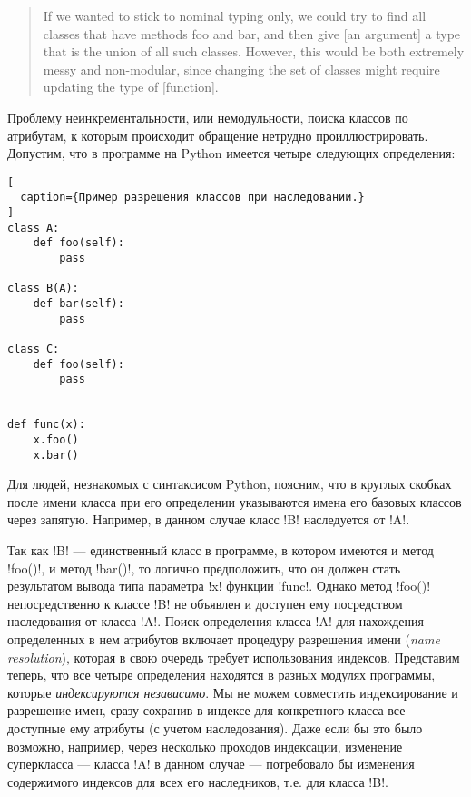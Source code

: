 \begin{quote}
  If we wanted to stick to nominal typing only, we could try to find all classes
  that have methods foo and bar, and then give [an argument] a type that is the
  union of all such classes. However, this would be both extremely messy and
  non-modular, since changing the set of classes might require updating the type
  of [function].
\end{quote}

Проблему неинкрементальности, или немодульности, поиска классов по атрибутам, к
которым происходит обращение нетрудно проиллюстрировать. Допустим, что в
программе на Python имеется четыре следующих определения:

\begin{lstlisting}[
  caption={Пример разрешения классов при наследовании.}
]
class A:
    def foo(self):
        pass

class B(A):
    def bar(self):
        pass

class C:
    def foo(self):
        pass


def func(x):
    x.foo()
    x.bar()

\end{lstlisting}

Для людей, незнакомых с синтаксисом Python, поясним, что в круглых скобках после
имени класса при его определении указываются имена его базовых классов
через запятую. Например, в данном случае класс !B! наследуется от !A!.

Так как !B! --- единственный класс в программе, в котором имеются и метод
!foo()!, и метод !bar()!, то логично предположить, что он должен стать
результатом вывода типа параметра !x!  функции !func!. Однако метод !foo()!
непосредственно к классе !B!  не объявлен и доступен ему посредством
наследования от класса !A!. Поиск определения класса !A! для нахождения
определенных в нем атрибутов включает процедуру разрешения имени (\emph{name
  resolution}), которая в свою очередь требует использования индексов.
Представим теперь, что все четыре определения находятся в разных модулях
программы, которые \emph{индексируются независимо}. Мы не можем совместить
индексирование и разрешение имен, сразу сохранив в индексе для конкретного
класса все доступные ему атрибуты (с учетом наследования).  Даже если бы это
было возможно, например, через несколько проходов индексации, изменение
суперкласса --- класса !A! в данном случае --- потребовало бы изменения
содержимого индексов для всех его наследников, т.е. для класса !B!. 

